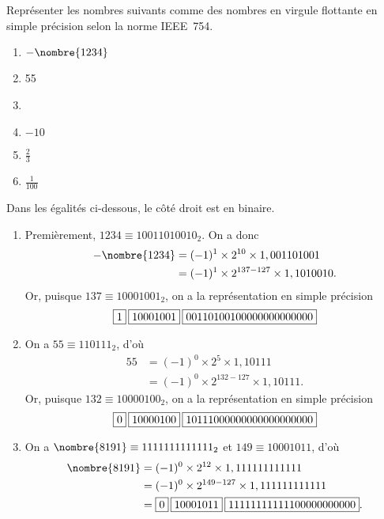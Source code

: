 \begin{exercice}
  Représenter les nombres suivants comme des nombres en virgule
  flottante en simple précision selon la norme IEEE~754.
  \begin{enumerate}
  \item $-\nombre{1234}$
  \item 55
  \item {}
  \item $-10$
  \item $\frac{2}{3}$
  \item $\frac{1}{100}$
  \end{enumerate}
  \begin{sol}
    Dans les égalités ci-dessous, le côté droit est en binaire.
    \begin{enumerate}
    \item Premièrement, $1234 \equiv 10011010010_2$. On a donc
      \begin{align*}
        -\nombre{1234}
        &= (-1)^1 \times 2^{10} \times 1,001101001 \\
        &= (-1)^1 \times 2^{137 - 127} \times 1,1010010.
      \end{align*}
      Or, puisque $137 \equiv 10001001_2$, on a la représentation en
      simple précision
      \begin{displaymath}
        \fbox{$1$}\hspace{2pt}\fbox{$10001001$}\hspace{2pt}\fbox{$00110100100000000000000$}
      \end{displaymath}
    \item On a $55 \equiv 110111_2$, d'où
      \begin{align*}
        55
        &= (-1)^0 \times 2^5 \times 1,10111 \\
        &= (-1)^0 \times 2^{132 - 127} \times 1,10111.
      \end{align*}
      Or, puisque $132 \equiv 10000100_2$, on a la représentation en
      simple précision
      \begin{displaymath}
        \fbox{$0$}\hspace{2pt}\fbox{$10000100$}\hspace{2pt}\fbox{$10111000000000000000000$}
      \end{displaymath}
    \item On a $\nombre{8191} \equiv 1111111111111_2$ et $149 \equiv
      10001011$, d'où
      \begin{align*}
        \nombre{8191}
        &= (-1)^0 \times 2^{12} \times 1,111111111111 \\
        &= (-1)^0 \times 2^{149 - 127} \times 1,111111111111 \\
        &= \ieee{0}{10001011}{11111111111100000000000}.

\end{align*}
\end{enumerate}
\end{sol}
\end{exercice}
